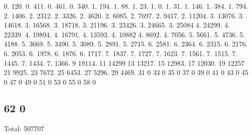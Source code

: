 0. 120. 0. 411. 0. 461. 0. 340. 1. 194. 1. 88. 1. 23. 1. 0. 1. 31. 1. 146. 1. 384. 1. 794. 2. 1406. 2. 2312. 2. 3326. 2. 4620. 2. 6085. 2. 7697. 2. 9417. 2. 11204. 3. 13076. 3. 14618. 3. 16568. 3. 18718. 3. 21196. 3. 23426. 3. 24665. 3. 25084 4. 24299. 4. 22339. 4. 19894. 4. 16791. 4. 13593. 4. 10882 4. 8692. 4. 7056. 5. 5661. 5. 4736. 5. 4188. 5. 3669. 5. 3490. 5. 3089. 5. 2891. 5. 2715. 6. 2581. 6. 2364. 6. 2315. 6. 2176. 6. 2053. 6. 1978. 6. 1876. 6. 1717. 7. 1837. 7. 1727. 7. 1623. 7. 1561. 7. 1515. 7. 1445. 7. 1434. 7. 1366. 9 19114. 11 14299 13 13217. 15 12983. 17 12030. 19 12257 21 9925. 23 7672. 25 6453. 27 5296. 29 4469. 31 0 33 0 35 0 37 0 39 0 41 0 43 0 45 0 47 0 49 0 51 0 53 0 55 0 58 0 \subsection*{62 0 }

Total\+: 507707 